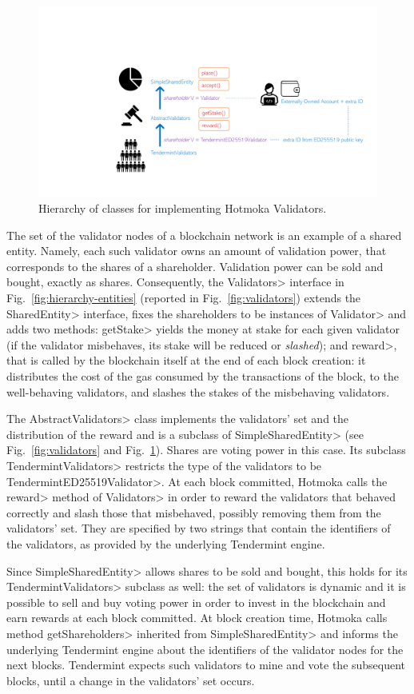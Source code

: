 \begin{figure}[ht]
\centering
\includegraphics[width=.9\linewidth]{figures/takamaka_validators}
\caption{Hierarchy of classes for implementing Hotmoka Validators.}
\label{figure.takamaka_validators}
\end{figure}

The set of the validator nodes of a blockchain network is an example of a shared entity.
Namely, each such validator owns an amount of validation power, that corresponds to the shares
of a shareholder. Validation power can be sold and bought, exactly as shares.
Consequently, the \<Validators> interface in Fig.~\ref{fig:hierarchy-entities}
(reported in Fig.~\ref{fig:validators})
extends the \<SharedEntity> interface, fixes the shareholders to be
instances of \<Validator> and adds two methods: \<getStake> yields the money
at stake for each given validator (if the validator misbehaves, its stake will be reduced or
\emph{slashed}); and \<reward>, that is called by the blockchain itself at the end of each
block creation: it distributes the cost of the gas consumed by the transactions of the block,
to the well-behaving validators, and slashes the stakes of the misbehaving validators.

The \<AbstractValidators> class implements the validators' set
and the distribution of the reward and is a subclass of \<SimpleSharedEntity>
(see Fig.~\ref{fig:validators} and Fig.~\ref{figure.takamaka_validators}).
Shares are voting power in this case.
Its subclass \<TendermintValidators> restricts the type of the validators
to be \<TendermintED25519Validator>.
At each block committed, Hotmoka calls the \<reward> method of \<Validators>
in order to reward the validators that behaved correctly
and slash those that misbehaved, possibly removing them from the validators' set.
They are specified by two strings
that contain the identifiers of the validators, as provided by the underlying
Tendermint engine.

Since \<SimpleSharedEntity> allows shares to be sold and bought, this holds for
its \<TendermintValidators> subclass as well: the set of validators
is dynamic and it is possible to sell and buy voting power in order to invest in the blockchain
and earn rewards at each block committed. At block creation time,
Hotmoka calls method \<getShareholders> inherited from
\<SimpleSharedEntity> and informs the
underlying Tendermint engine about the identifiers of the validator nodes for the next blocks.
Tendermint expects such validators to mine and vote the subsequent blocks, until a change in the
validators' set occurs.

